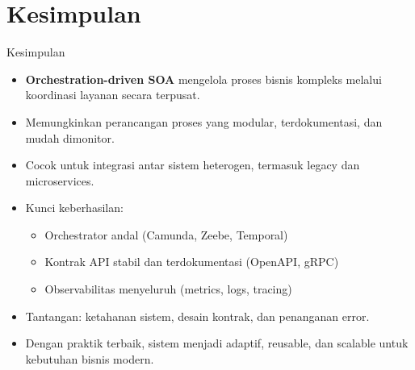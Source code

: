 \documentclass[aspectratio=169, table]{beamer}
\begin{document}
\section{Kesimpulan}
\begin{frame}[fragile]{Kesimpulan}
	\vspace{4pt}
	\begin{itemize}
		\item \textbf{Orchestration-driven SOA} mengelola proses bisnis kompleks melalui koordinasi layanan secara terpusat.
		\item Memungkinkan perancangan proses yang modular, terdokumentasi, dan mudah dimonitor.
		\item Cocok untuk integrasi antar sistem heterogen, termasuk legacy dan microservices.
		\item Kunci keberhasilan:
		\begin{itemize}
			\item Orchestrator andal (Camunda, Zeebe, Temporal)
			\item Kontrak API stabil dan terdokumentasi (OpenAPI, gRPC)
			\item Observabilitas menyeluruh (metrics, logs, tracing)
		\end{itemize}
		\item Tantangan: ketahanan sistem, desain kontrak, dan penanganan error.
		\item Dengan praktik terbaik, sistem menjadi adaptif, reusable, dan scalable untuk kebutuhan bisnis modern.
	\end{itemize}
\end{frame}
\end{document}
